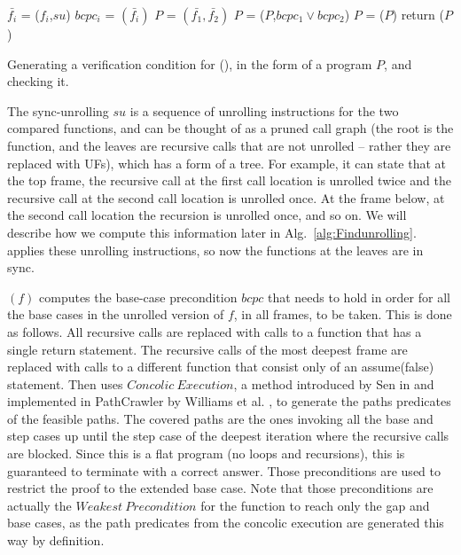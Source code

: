 \noindent
\begin{algorithm}
\begin{minipage}{\linewidth}
\begin{algorithmic}[1]
    \label{step:foreach_p}
	\State$\bar{f_i}$ = ($f_i$,$su$)
	\State $bcpc_i$ = $(\bar{f_i})$
	\EndFor
	\State $P$ = $(\bar{f_1},\bar{f_2})$
    \State $P$ = ($P$,$bcpc_1 \lor bcpc_2$) \label{step:assumebcpc12}
    \State $P$ = ($P$)
    \State return ($P$)
	\EndFunction
\end{algorithmic}
\end{minipage}
\caption{Generating a verification condition for (), in the form of a program $P$, and checking it.}
\label{alg:ExtendedBaseProof}
\end{algorithm}
The sync-unrolling $su$ is a sequence of unrolling instructions for the two compared functions, and can be thought of as a pruned call graph (the root is the function, and the leaves are recursive calls that are not unrolled -- rather they are replaced with UFs), which has a form of a tree. For example, it can state that at the top frame, the recursive call at the first call location is unrolled twice and the recursive call at the second call location is unrolled once. At the frame below, at the second call location the recursion is unrolled once, and so on. We will describe how we compute this information later in Alg.~\ref{alg:Findunrolling}.  applies these unrolling instructions, so now the functions at the leaves are in sync. 

$(f)$ computes the base-case precondition $bcpc$ that needs to hold in order for all the base cases in the unrolled version of $f$, in all frames, to be taken. This is done as follows. All recursive calls are replaced with calls to a function that has a single return statement. The recursive calls of the most deepest frame are replaced with calls to a different function that consist only of an assume(false) statement. Then  uses $Concolic\ Execution$, a method introduced by Sen in \cite{10.1145/1321631.1321746} and implemented in PathCrawler by Williams et al. \cite{10.1007/11408901_21}, to generate the paths predicates of the feasible paths. The covered paths are the ones invoking all the base and step cases up until the step case of the deepest iteration where the recursive calls are blocked. Since this is a flat program (no loops and recursions), this is guaranteed to terminate with a correct answer. Those preconditions are used to restrict the proof to the extended base case. Note that those preconditions are actually the $Weakest\ Precondition$ \cite{10.1145/360933.360975} for the function to reach only the gap and base cases, as the path predicates from the concolic execution are generated this way by definition.

